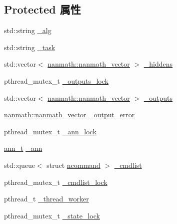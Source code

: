 \subsection*{Protected 属性}
\begin{DoxyCompactItemize}
\item 
std\+::string \hyperlink{classnanai_1_1nanai__ann__nanncalc_a66ab62c75be9da3951abd85e1eb296e0}{\+\_\+alg}
\item 
std\+::string \hyperlink{classnanai_1_1nanai__ann__nanncalc_ab659b8655ab02f5922ecb19c6418f02c}{\+\_\+task}
\item 
std\+::vector$<$ \hyperlink{classnanmath_1_1nanmath__vector}{nanmath\+::nanmath\+\_\+vector} $>$ \hyperlink{classnanai_1_1nanai__ann__nanncalc_a1e15116b2a2d7b5c8ddb9579de11f5ae}{\+\_\+hiddens}
\item 
pthread\+\_\+mutex\+\_\+t \hyperlink{classnanai_1_1nanai__ann__nanncalc_a1c9006356f22904fee12c3635cdc8a15}{\+\_\+outputs\+\_\+lock}
\item 
std\+::vector$<$ \hyperlink{classnanmath_1_1nanmath__vector}{nanmath\+::nanmath\+\_\+vector} $>$ \hyperlink{classnanai_1_1nanai__ann__nanncalc_a6d00ff0323ee2fd5c1cfbd0f775da125}{\+\_\+outputs}
\item 
\hyperlink{classnanmath_1_1nanmath__vector}{nanmath\+::nanmath\+\_\+vector} \hyperlink{classnanai_1_1nanai__ann__nanncalc_abee00d840fe641d5c69aa1c621333179}{\+\_\+output\+\_\+error}
\item 
pthread\+\_\+mutex\+\_\+t \hyperlink{classnanai_1_1nanai__ann__nanncalc_ab05880760848bb308d30833b362f60a8}{\+\_\+ann\+\_\+lock}
\item 
\hyperlink{classnanai_1_1nanai__ann__nanncalc_1_1ann__t}{ann\+\_\+t} \hyperlink{classnanai_1_1nanai__ann__nanncalc_a3b0bfac7c99ef9d83769efd2936e4638}{\+\_\+ann}
\item 
std\+::queue$<$ struct \hyperlink{structnanai_1_1nanai__ann__nanncalc_1_1ncommand}{ncommand} $>$ \hyperlink{classnanai_1_1nanai__ann__nanncalc_a9af0b8bc21e0d398f3f9489acf1dfab7}{\+\_\+cmdlist}
\item 
pthread\+\_\+mutex\+\_\+t \hyperlink{classnanai_1_1nanai__ann__nanncalc_a92213def4dd3f7f0693159a79446ea09}{\+\_\+cmdlist\+\_\+lock}
\item 
pthread\+\_\+t \hyperlink{classnanai_1_1nanai__ann__nanncalc_ad8115ff56ea159a5e1d43c9752ed5936}{\+\_\+thread\+\_\+worker}
\item 
pthread\+\_\+mutex\+\_\+t \hyperlink{classnanai_1_1nanai__ann__nanncalc_a25ab2c0cf73a5ff7201ad1cd339626dc}{\+\_\+state\+\_\+lock}
\item 

\end{DoxyCompactItemize}
